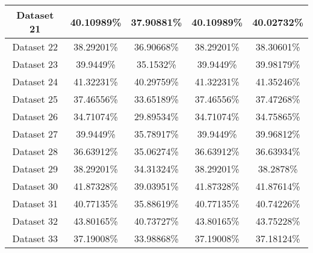 \begin{center}
\begin{tabular}{ |c||c|c|c|c| }
    \hline
    Dataset 21&40.10989\%&37.90881\%&40.10989\%&40.02732\%\\
    \hline
    Dataset 22&38.29201\%&36.90668\%&38.29201\%&38.30601\%\\
    \hline
    Dataset 23&39.9449\%&35.1532\%&39.9449\%&39.98179\%\\
    \hline
    Dataset 24&41.32231\%&40.29759\%&41.32231\%&41.35246\%\\
    \hline
    Dataset 25&37.46556\%&33.65189\%&37.46556\%&37.47268\%\\
    \hline
    Dataset 26&34.71074\%&29.89534\%&34.71074\%&34.75865\%\\
    \hline
    Dataset 27&39.9449\%&35.78917\%&39.9449\%&39.96812\%\\
    \hline
    Dataset 28&36.63912\%&35.06274\%&36.63912\%&36.63934\%\\
    \hline
    Dataset 29&38.29201\%&34.31324\%&38.29201\%&38.2878\%\\
    \hline
    Dataset 30&41.87328\%&39.03951\%&41.87328\%&41.87614\%\\
    \hline
    Dataset 31&40.77135\%&35.88619\%&40.77135\%&40.74226\%\\
    \hline
    Dataset 32&43.80165\%&40.73727\%&43.80165\%&43.75228\%\\
    \hline
    Dataset 33&37.19008\%&33.98868\%&37.19008\%&37.18124\%\\
    \hline
\end{tabular}
\end{center}

\newpage

